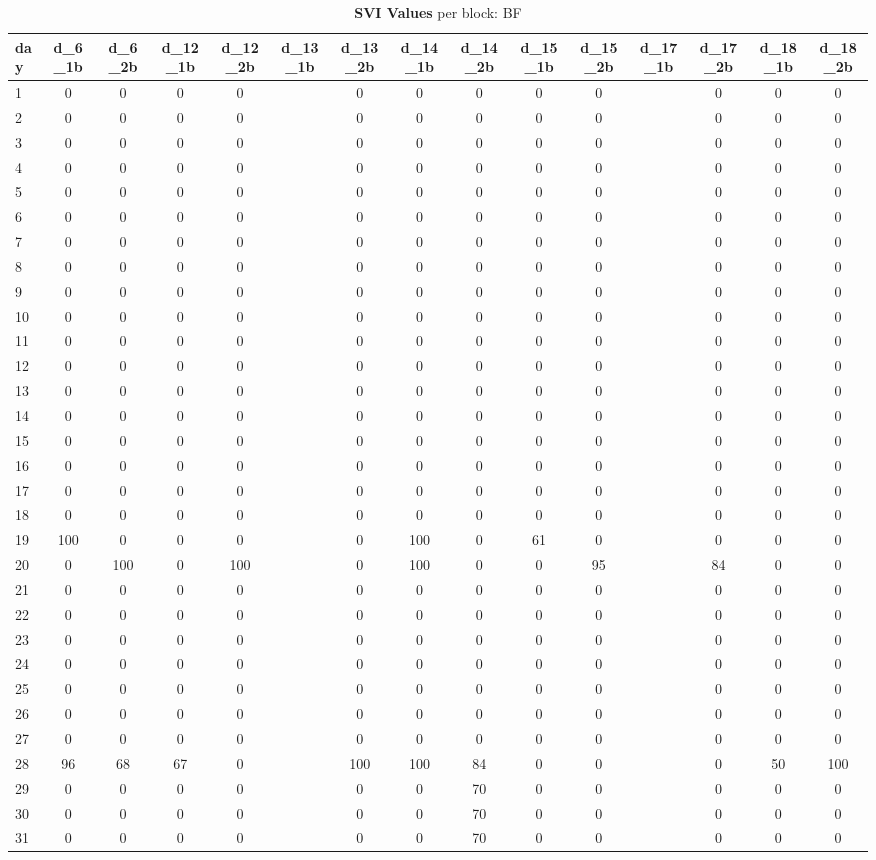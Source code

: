\documentclass[a4paper,12pt]{article}
\begin{document}
\begin{landscape}
\begin{footnotesize}
\begin{center}
\begin{longtable}{lcccccccccccccc}
\caption{\textbf{SVI Values} per block: BF\label{tab_bf_1}}
\hline
day&d\_6\_1b&d\_6\_2b&d\_12\_1b&d\_12\_2b&d\_13\_1b&d\_13\_2b&d\_14\_1b&d\_14\_2b&d\_15\_1b&d\_15\_2b&d\_17\_1b&d\_17\_2b&d\_18\_1b&d\_18\_2b \\ \hline
1&0&0&0&0&&0&0&0&0&0&&0&0&0 \\
2&0&0&0&0&&0&0&0&0&0&&0&0&0 \\
3&0&0&0&0&&0&0&0&0&0&&0&0&0 \\
4&0&0&0&0&&0&0&0&0&0&&0&0&0 \\
5&0&0&0&0&&0&0&0&0&0&&0&0&0 \\
6&0&0&0&0&&0&0&0&0&0&&0&0&0 \\
7&0&0&0&0&&0&0&0&0&0&&0&0&0 \\
8&0&0&0&0&&0&0&0&0&0&&0&0&0 \\
9&0&0&0&0&&0&0&0&0&0&&0&0&0 \\
10&0&0&0&0&&0&0&0&0&0&&0&0&0 \\
11&0&0&0&0&&0&0&0&0&0&&0&0&0 \\
12&0&0&0&0&&0&0&0&0&0&&0&0&0 \\
13&0&0&0&0&&0&0&0&0&0&&0&0&0 \\
14&0&0&0&0&&0&0&0&0&0&&0&0&0 \\
15&0&0&0&0&&0&0&0&0&0&&0&0&0 \\
16&0&0&0&0&&0&0&0&0&0&&0&0&0 \\
17&0&0&0&0&&0&0&0&0&0&&0&0&0 \\
18&0&0&0&0&&0&0&0&0&0&&0&0&0 \\
19&100&0&0&0&&0&100&0&61&0&&0&0&0 \\
20&0&100&0&100&&0&100&0&0&95&&84&0&0 \\
21&0&0&0&0&&0&0&0&0&0&&0&0&0 \\
22&0&0&0&0&&0&0&0&0&0&&0&0&0 \\
23&0&0&0&0&&0&0&0&0&0&&0&0&0 \\
24&0&0&0&0&&0&0&0&0&0&&0&0&0 \\
25&0&0&0&0&&0&0&0&0&0&&0&0&0 \\
26&0&0&0&0&&0&0&0&0&0&&0&0&0 \\
27&0&0&0&0&&0&0&0&0&0&&0&0&0 \\
28&96&68&67&0&&100&100&84&0&0&&0&50&100 \\
29&0&0&0&0&&0&0&70&0&0&&0&0&0 \\
30&0&0&0&0&&0&0&70&0&0&&0&0&0 \\
31&0&0&0&0&&0&0&70&0&0&&0&0&0 \\ \hline
\end{longtable}
\end{center}
\end{footnotesize}
\end{landscape}
\end{document}
